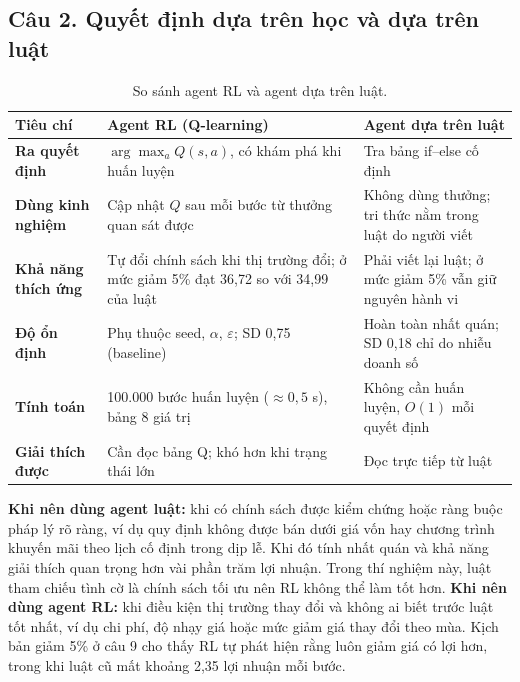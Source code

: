 \documentclass[12pt,a4paper]{report}
\begin{document}
\subsection*{Câu 2. Quyết định dựa trên học và dựa trên luật}
\begin{table}[H]
\centering
\small
\caption{So sánh agent RL và agent dựa trên luật.}
\begin{tabularx}{\textwidth}{>{\bfseries}p{2.8cm}XX}
\toprule
Tiêu chí & Agent RL (Q-learning) & Agent dựa trên luật \\
\midrule
Ra quyết định & $\arg\max_aQ(s,a)$, có khám phá khi huấn luyện & Tra bảng if--else cố định \\
Dùng kinh nghiệm & Cập nhật $Q$ sau mỗi bước từ thưởng quan sát được & Không dùng thưởng; tri thức nằm trong luật do người viết \\
Khả năng thích ứng & Tự đổi chính sách khi thị trường đổi; ở mức giảm 5\% đạt 36{,}72 so với 34{,}99 của luật & Phải viết lại luật; ở mức giảm 5\% vẫn giữ nguyên hành vi \\
Độ ổn định & Phụ thuộc seed, $\alpha$, $\varepsilon$; SD 0{,}75 (baseline) & Hoàn toàn nhất quán; SD 0{,}18 chỉ do nhiễu doanh số \\
Tính toán & 100.000 bước huấn luyện ($\approx0{,}5$ s), bảng 8 giá trị & Không cần huấn luyện, $O(1)$ mỗi quyết định \\
Giải thích được & Cần đọc bảng Q; khó hơn khi trạng thái lớn & Đọc trực tiếp từ luật \\
\bottomrule
\end{tabularx}
\end{table}
\textbf{Khi nên dùng agent luật:} khi có chính sách được kiểm chứng hoặc ràng buộc
pháp lý rõ ràng, ví dụ quy định không được bán dưới giá vốn hay chương trình khuyến
mãi theo lịch cố định trong dịp lễ. Khi đó tính nhất quán và khả năng giải thích
quan trọng hơn vài phần trăm lợi nhuận. Trong thí nghiệm này, luật tham chiếu tình cờ
là chính sách tối ưu nên RL không thể làm tốt hơn.
\textbf{Khi nên dùng agent RL:} khi điều kiện thị trường thay đổi và không ai biết
trước luật tốt nhất, ví dụ chi phí, độ nhạy giá hoặc mức giảm giá thay đổi theo mùa.
Kịch bản giảm 5\% ở câu 9 cho thấy RL tự phát hiện rằng luôn giảm giá có lợi hơn,
trong khi luật cũ mất khoảng 2{,}35 lợi nhuận mỗi bước.

\end{document}
